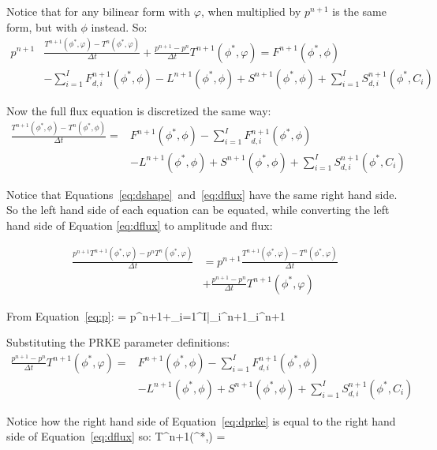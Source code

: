 Notice that for any bilinear form with $\varphi$, when multiplied by $p^{n+1}$ is the same form, but with $\phi$ instead. So:
\begin{align}
p^{n+1}&\frac{T^{n+1}(\phi^{*},\varphi)-T^{n}(\phi^{*},\varphi)}{\Delta t} + \frac{p^{n+1} - p^n}{\Delta t}T^{n+1}(\phi^{*},\varphi)= F^{n+1}(\phi^{*},\phi)  \nonumber \\
&- \sum_{i=1}^I F_{d,i}^{n+1}(\phi^{*},\phi) - L^{n+1}(\phi^{*},\phi) + S^{n+1}(\phi^{*},\phi) + \sum_{i=1}^I S_{d,i}^{n+1}(\phi^{*},C_i)
\label{eq:dshape}
\end{align}

Now the full flux equation is discretized the same way:
\begin{align}
\frac{T^{n+1}(\phi^{*},\phi)-T^{n}(\phi^{*},\phi)}{\Delta t} =& F^{n+1}(\phi^{*},\phi)- \sum_{i=1}^I F_{d,i}^{n+1}(\phi^{*},\phi) \nonumber \\
& - L^{n+1}(\phi^{*},\phi) + S^{n+1}(\phi^{*},\phi) + \sum_{i=1}^I S_{d,i}^{n+1}(\phi^{*},C_i)
\label{eq:dflux}
\end{align}

Notice that Equations~\ref{eq:dshape}~and~\ref{eq:dflux} have the same right hand side. So the left hand side of each equation can be equated, while converting the left hand side of Equation \ref{eq:dflux} to amplitude and flux:

\begin{align}
\frac{p^{n+1}T^{n+1}(\phi^{*},\varphi)-p^nT^{n}(\phi^{*},\varphi)}{\Delta t} &= p^{n+1}\frac{T^{n+1}(\phi^{*},\varphi)-T^{n}(\phi^{*},\varphi)}{\Delta t} \nonumber \\
&+ \frac{p^{n+1} - p^n}{\Delta t}T^{n+1}(\phi^{*},\varphi)
\label{eq:neq}
\end{align}

From Equation~\ref{eq:p}:
\be
{} = p^{n+1}+\sum_{i=1}^I\bar{\lambda}_i^{n+1}\xi_i^{n+1}
\ee

Substituting the PRKE parameter definitions:
\begin{align}
\frac{p^{n+1} - p^n}{\Delta t} T^{n+1}(\phi^{*},\varphi) =& F^{n+1}(\phi^{*},\phi)- \sum_{i=1}^I F_{d,i}^{n+1}(\phi^{*},\phi) \nonumber \\
& - L^{n+1}(\phi^{*},\phi) + S^{n+1}(\phi^{*},\phi) + \sum_{i=1}^I S_{d,i}^{n+1}(\phi^{*},C_i)
\label{eq:dprke}
\end{align}

Notice how the right hand side of Equation~\ref{eq:dprke} is equal to the right hand side of Equation~\ref{eq:dflux} so:
\be
{} T^{n+1}(\phi^{*},\varphi) = 
\ee

